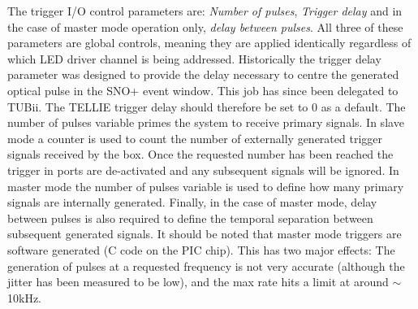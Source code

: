 \documentclass[12pt]{report}
\begin{document}
The trigger I/O control parameters are: \textit{Number of pulses}, \textit{Trigger delay} and in the case of master mode operation only, \textit{delay between pulses}. All three of these parameters are global controls, meaning they are applied identically regardless of which LED driver channel is being addressed. Historically the trigger delay parameter was designed to provide the delay necessary to centre the generated optical pulse in the SNO+ event window. This job has since been delegated to TUBii. The TELLIE trigger delay should therefore be set to 0 as a default. The number of pulses variable primes the system to receive primary signals. In slave mode a counter is used to count the number of externally generated trigger signals received by the box. Once the requested number has been reached the trigger in ports are de-activated and any subsequent signals will be ignored. In master mode the number of pulses variable is used to define how many primary signals are internally generated. Finally, in the case of master mode, delay between pulses is also required to define the temporal separation between subsequent generated signals. It should be noted that master mode triggers are software generated (C code on the PIC chip). This has two major effects: The generation of pulses at a requested frequency is not very accurate (although the jitter has been measured to be low), and the max rate hits a limit at around $\sim$10kHz.
\end{document}
